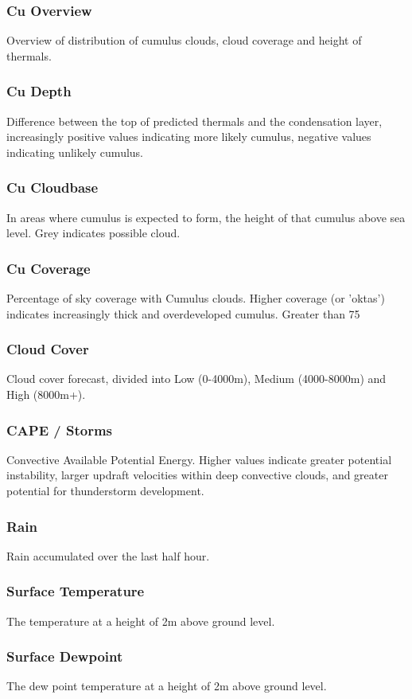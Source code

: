 \documentclass[11pt,a4paper]{article}
\begin{document}
\subsubsection{Cu Overview}
Overview of distribution of cumulus clouds, cloud coverage and height of thermals.
\subsubsection{Cu Depth}
Difference between the top of predicted thermals and the condensation layer, increasingly positive values indicating more likely cumulus, negative values indicating unlikely cumulus.
\subsubsection{Cu Cloudbase}
In areas where cumulus is expected to form, the height of that cumulus above sea level. Grey indicates possible cloud.
\subsubsection{Cu Coverage}
Percentage of sky coverage with Cumulus clouds. Higher coverage (or 'oktas') indicates increasingly thick and overdeveloped cumulus. Greater than 75%
\subsubsection{Cloud Cover}
Cloud cover forecast, divided into Low (0-4000m), Medium (4000-8000m) and High (8000m+).
\subsubsection{CAPE / Storms}
Convective Available Potential Energy. Higher values indicate greater potential instability, larger updraft velocities within deep convective clouds, and greater potential for thunderstorm development.
\subsubsection{Rain}
Rain accumulated over the last half hour.
\subsubsection{Surface Temperature}
The temperature at a height of 2m above ground level.
\subsubsection{Surface Dewpoint}
The dew point temperature at a height of 2m above ground level.
\end{document}
